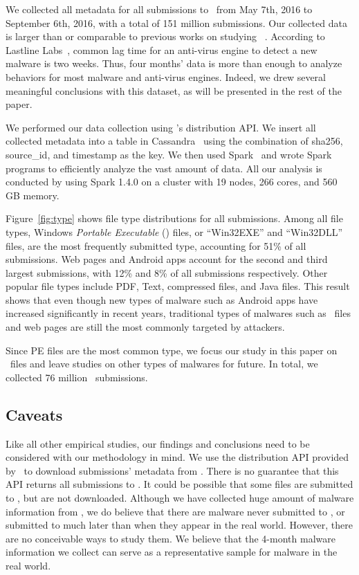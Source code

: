 We collected all metadata for all submissions to \vt\ from May 7th, 2016 to September 6th, 2016,
with a total of 151 million submissions. 
Our collected data is larger than or comparable to previous works on studying \vt~\cite{SongAPsys2016,huangvt2016bigdata}.
According to Lastline Labs~\cite{Lastline}, common lag time for an anti-virus engine to detect a new malware is two weeks.
Thus, four months' data is more than enough to analyze behaviors for most malware and anti-virus engines. 
Indeed, we drew several meaningful conclusions with this dataset, as will be presented in the rest of the paper.

We performed our data collection using \vt{}'s distribution API.
We insert all collected metadata into a table in Cassandra~\cite{cassandra} 
using the combination of sha256, source\_id, and timestamp as the key.
We then used Spark~\cite{spark} and wrote Spark programs to efficiently analyze the vast amount of data.
All our analysis is conducted by using Spark 1.4.0 on a cluster with 19 nodes, 266 cores, and 560 GB memory. 


Figure~\ref{fig:type} shows file type distributions for all submissions. 
Among all file types, Windows \textit{Portable Executable} ({\em \pe}) files, 
or ``Win32EXE'' and ``Win32DLL'' files, 
are the most frequently submitted type,
accounting for 51\% of all submissions.
Web pages and Android apps account for the second and third largest submissions, 
with 12\% and 8\% of all submissions respectively. 
Other popular file types include PDF, Text, compressed files, and Java files. 
This result shows that even though new types of malware such as Android apps have
increased significantly in recent years, 
traditional types of malwares such as \pe\ files and web pages are still the 
most commonly targeted by attackers.

Since PE files are the most common type,
we focus our study in this paper on \pe\ files 
and leave studies on other types of malwares for future. 
In total, we collected 76 million \pe\ submissions.


\subsection{Caveats}
Like all other empirical studies, 
our findings and conclusions need to be considered with our methodology in mind. 
We use the distribution API provided by \vt\ to download submissions' metadata 
from \vt. 
There is no guarantee that this API returns all submissions to \vt.
It could be possible that some files are submitted to \vt, 
but are not downloaded. %
Although we have collected huge amount of malware information from \vt,
we do believe that there are malware never submitted to \vt, 
or submitted to \vt much later than when they appear in the real world. 
However, there are no conceivable ways to study them.
We believe that the 4-month malware information we collect can serve as a representative sample for malware in the real world. 
